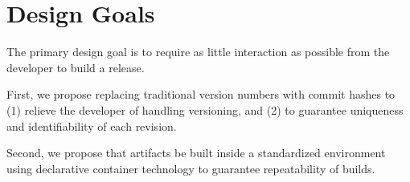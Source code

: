 \section{Design Goals}

The primary design goal is to require as little interaction as possible from the developer to build a release.


First, we propose replacing traditional version numbers with commit hashes to (1) relieve the developer of handling versioning, and (2) to guarantee uniqueness and identifiability of each revision.

Second, we propose that artifacts be built inside a standardized environment using declarative container technology to guarantee repeatability of builds.
